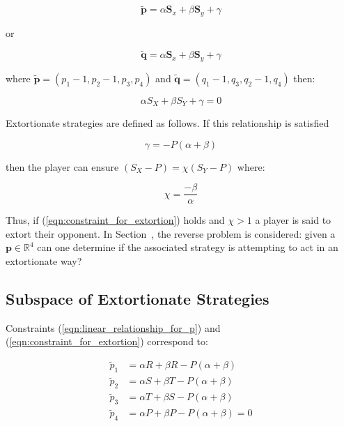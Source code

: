 \documentclass[a4paper]{article}
\begin{document}
\begin{equation}\label{eqn:linear_relationship_for_p}
    \tilde{\textbf{p}}=\alpha \textbf{S}_x + \beta \textbf{S}_y + \gamma
\end{equation}

or

\begin{equation}\label{eqn:linear_relationship_for_q}
    \tilde{\textbf{q}}=\alpha \textbf{S}_x + \beta \textbf{S}_y + \gamma
\end{equation}

where \(\tilde{\textbf{p}} = (p_1 - 1, p_2 - 1, p_3, p_4)\) and
\(\tilde{\textbf{q}} = (q_1 - 1, q_3, q_2 - 1, q_4)\) then:

\begin{equation}
    \alpha S_X + \beta S_Y + \gamma = 0
\end{equation}

Extortionate strategies are defined as follows. If this relationship is
satisfied

\begin{equation}\label{eqn:constraint_for_extortion}
    \gamma = - P(\alpha + \beta)
\end{equation}

then the player can ensure \((S_X - P)=\chi(S_Y-P)\) where:

\begin{equation}\label{eqn:definition_of_chi}
    \chi=\frac{-\beta}{\alpha}
\end{equation}

\noindent Thus, if (\ref{eqn:constraint_for_extortion}) holds and \(\chi >1\) a player is
said to extort their opponent.
In Section~\label{sec:subspace_of_extortionate_strategies}, the reverse problem is considered: given a
\(\textbf{p}\in\mathbb{R}^4\) can one determine if the associated strategy is attempting
to act in an extortionate way?

\subsection{Subspace of Extortionate Strategies}\label{sec:subspace_of_extortionate_strategies}

Constraints (\ref{eqn:linear_relationship_for_p}) and
(\ref{eqn:constraint_for_extortion}) correspond to:

\begin{align}
    \tilde p_1 & = \alpha R + \beta R - P (\alpha + \beta)
            \label{eqn:condition_for_tilde_p1}\\
    \tilde p_2 & = \alpha S + \beta T - P (\alpha + \beta)
            \label{eqn:condition_for_tilde_p2}\\
    \tilde p_3 & = \alpha T + \beta S - P (\alpha + \beta)
            \label{eqn:condition_for_tilde_p3}\\
    \tilde p_4 & = \alpha P + \beta P - P (\alpha + \beta) = 0
            \label{eqn:condition_for_tilde_p4}
\end{align}
\end{document}
